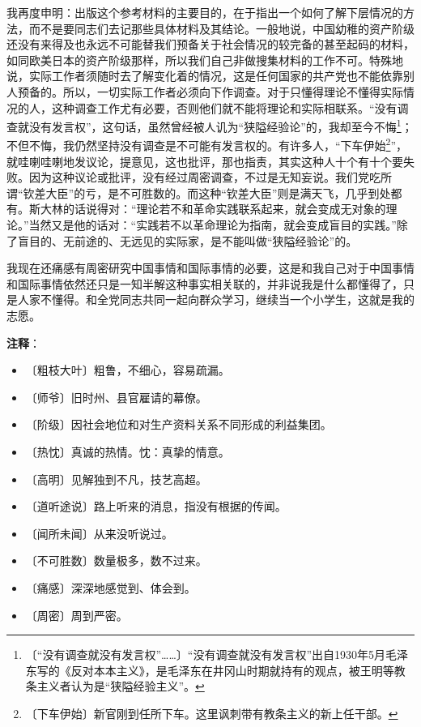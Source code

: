 \documentclass[12pt,UTF-8,openany]{ctexbook}
\begin{document}
\begin{large}
    我再度申明：出版这个参考材料的主要目的，在于指出一个如何了解下层情况的方法，而不是要同志们去记那些具体材料及其结论。一般地说，中国幼稚的资产阶级还没有来得及也永远不可能替我们预备关于社会情况的较完备的甚至起码的材料，如同欧美日本的资产阶级那样，所以我们自己非做搜集材料的工作不可。特殊地说，实际工作者须随时去了解变化着的情况，这是任何国家的共产党也不能依靠别人预备的。所以，一切实际工作者必须向下作调查。对于只懂得理论不懂得实际情况的人，这种调查工作尤有必要，否则他们就不能将理论和实际相联系。“没有调查就没有发言权”，这句话，虽然曾经被人讥为“狭隘经验论”的，我却至今不悔\footnote{〔“没有调查就没有发言权”……〕“没有调查就没有发言权”出自1930年5月毛泽东写的《反对本本主义》，是毛泽东在井冈山时期就持有的观点，被王明等教条主义者认为是“狭隘经验主义”。}；不但不悔，我仍然坚持没有调查是不可能有发言权的。有许多人，“下车伊始\footnote{〔下车伊始〕新官刚到任所下车。这里讽刺带有教条主义的新上任干部。}”，就哇喇哇喇地发议论，提意见，这也批评，那也指责，其实这种人十个有十个要失败。因为这种议论或批评，没有经过周密调查，不过是无知妄说。我们党吃所谓“钦差大臣”的亏，是不可胜数的。而这种“钦差大臣”则是满天飞，几乎到处都有。斯大林的话说得对：“理论若不和革命实践联系起来，就会变成无对象的理论。”当然又是他的话对：“实践若不以革命理论为指南，就会变成盲目的实践。”除了盲目的、无前途的、无远见的实际家，是不能叫做“狭隘经验论”的。
    
    我现在还痛感有周密研究中国事情和国际事情的必要，这是和我自己对于中国事情和国际事情依然还只是一知半解这种事实相关联的，并非说我是什么都懂得了，只是人家不懂得。和全党同志共同一起向群众学习，继续当一个小学生，这就是我的志愿。
    
\end{large}


\newpage

\textbf{注释}：

\vspace{-1em}

\begin{itemize}
    \setlength\itemsep{-0.2em}
    \item 〔粗枝大叶〕粗鲁，不细心，容易疏漏。
    \item 〔师爷〕旧时州、县官雇请的幕僚。
    \item 〔阶级〕因社会地位和对生产资料关系不同形成的利益集团。
    \item 〔热忱〕真诚的热情。忱：真挚的情意。
    \item 〔高明〕见解独到不凡，技艺高超。
    \item 〔道听途说〕路上听来的消息，指没有根据的传闻。
    \item 〔闻所未闻〕从来没听说过。
    \item 〔不可胜数〕数量极多，数不过来。
    \item 〔痛感〕深深地感觉到、体会到。
    \item 〔周密〕周到严密。
\end{itemize}
\end{document}
